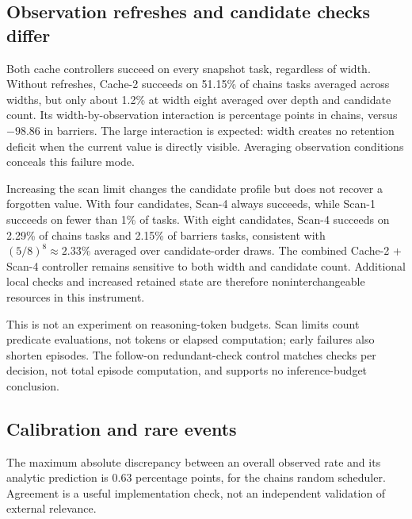\documentclass[sigconf,nonacm]{acmart}
\begin{document}
\begin{table}[t]
\centering
\small

\caption{High-minus-low main contrasts in percentage points. Depth: 8 minus
1; candidates: 8 minus 2; width: 8 minus 1; history: history minus snapshot.
Each averages all remaining levels equally within its family. The
supplement reports the corresponding paired intervals.}
\label{tab:contrasts}
\end{table}

\subsection{Observation refreshes and candidate checks differ}
Both cache controllers succeed on every snapshot task, regardless of
width. Without refreshes, Cache-2 succeeds on 51.15\% of chains tasks
averaged across widths, but only about 1.2\% at width eight averaged over
depth and candidate count. Its width-by-observation interaction is
\CacheInteraction{} percentage points in chains, versus $-98.86$ in barriers.
The large interaction is expected: width creates no retention deficit when
the current value is directly visible. Averaging observation conditions
conceals this failure mode.

Increasing the scan limit changes the candidate profile but does not
recover a forgotten value. With four candidates, Scan-4 always succeeds,
while Scan-1 succeeds on fewer than 1\% of tasks. With eight candidates,
Scan-4 succeeds on 2.29\% of chains tasks and 2.15\% of barriers tasks,
consistent with $(5/8)^8\approx2.33\%$ averaged over candidate-order draws.
The combined Cache-2 + Scan-4 controller remains sensitive to both width
and candidate count. Additional local checks and increased retained state
are therefore noninterchangeable resources in this instrument.

This is not an experiment on reasoning-token budgets. Scan limits count
predicate evaluations, not tokens or elapsed computation; early failures
also shorten episodes. The follow-on redundant-check control matches
checks per decision, not total episode computation, and supports no
inference-budget conclusion.

\subsection{Calibration and rare events}
The maximum absolute discrepancy between an overall observed rate and its
analytic prediction is 0.63 percentage points, for the chains random
scheduler. Agreement is a useful implementation check, not an independent
validation of external relevance.
\end{document}
